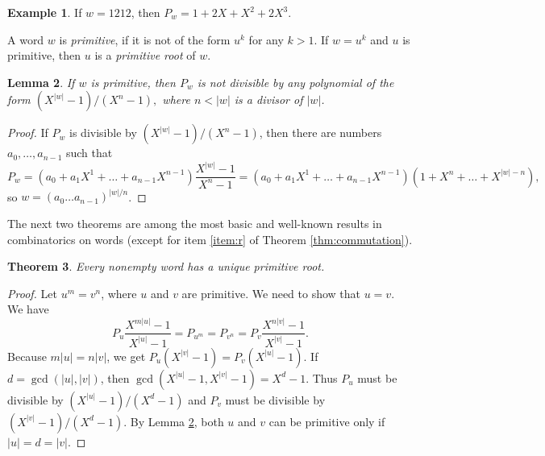 \documentclass[submission]{eptcs}
\newtheorem{theorem}{Theorem}[section]
\newtheorem{lemma}[theorem]{Lemma}
\theoremstyle{definition}
\newtheorem{example}[theorem]{Example}
\newcommand{\px}[1]{ P_{#1} }
\begin{document}
\begin{example}
If $w = 1212$, then
\begin{math}
    \px{w} = 1 + 2X + X^2 + 2X^3 .
\end{math}
\end{example}

A word $w$ is \emph{primitive}, if it is not of the form $u^k$ for
any $k > 1$. If $w = u^k$ and $u$ is primitive, then $u$ is a
\emph{primitive root} of $w$.

\begin{lemma} \label{lem:primdiv}
If $w$ is primitive, then $\px{w}$ is not divisible by any
polynomial of the form
\begin{math}
    (X^{|w|} - 1) / (X^{n} - 1),
\end{math}
where $n < |w|$ is a divisor of $|w|$.
\end{lemma}
\begin{proof}
If $\px{w}$ is divisible by $(X^{|w|} - 1) / (X^n - 1)$, then there
are numbers $a_0, \dots, a_{n-1}$ such that
\begin{equation*}
    \px{w}
    = (a_{0} + a_1 X^{1} + \dots + a_{n-1} X^{n-1})
        \frac{X^{|w|} - 1}{X^n - 1}
    = (a_{0} + a_1 X^{1} + \dots + a_{n-1} X^{n-1})
        (1 + X^n + \dots + X^{|w|-n}) ,
\end{equation*}
so $w = (a_{0} \dots a_{n-1})^{|w|/n}$.
\end{proof}

The next two theorems are among the most basic and well-known
results in combinatorics on words (except for item \eqref{item:r} of
Theorem \ref{thm:commutation}).

\begin{theorem}
Every nonempty word has a unique primitive root.
\end{theorem}
\begin{proof}
Let $u^m = v^n$, where $u$ and $v$ are primitive. We need to show
that $u = v$. We have
\begin{equation*}
    \px{u} \frac{X^{m|u|}-1}{X^{|u|}-1} = \px{u^m}
    = \px{v^n} = \px{v} \frac{X^{n|v|}-1}{X^{|v|}-1} .
\end{equation*}
Because $m|u| = n|v|$, we get
\begin{math}
    \px{u} (X^{|v|}-1) = \px{v} (X^{|u|}-1) .
\end{math}
If $d = \gcd(|u|, |v|)$, then $\gcd(X^{|u|}-1, X^{|v|}-1) = X^d-1$.
Thus $\px{u}$ must be divisible by $(X^{|u|}-1) / (X^d-1)$ and
$\px{v}$ must be divisible by $(X^{|v|}-1) / (X^d-1)$. By Lemma
\ref{lem:primdiv}, both $u$ and $v$ can be primitive only if $|u| =
d = |v|$.
\end{proof}
\end{document}
